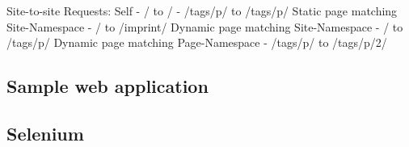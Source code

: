 \documentclass[f,bachelor,binding,twoside,palatino]{WeSTthesis}
\def \ajax {AJAX}
\def \pjaxr {PJAXR}
\begin{document}
  Site-to-site Requests:
    Self
      - / to /
      - /tags/p/ to /tags/p/
    Static page matching Site-Namespace
      - / to /imprint/
    Dynamic page matching Site-Namespace
      - / to /tags/p/
    Dynamic page matching Page-Namespace
      - /tags/p/ to /tags/p/2/

%
%
%


\subsection{Sample web application}

\subsection{Selenium}
\end{document}

